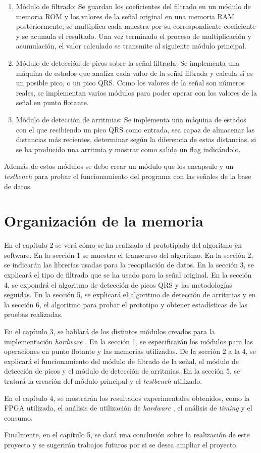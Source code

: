 	\begin{enumerate}
		\item Módulo de filtrado: Se guardan los coeficientes del filtrado en un módulo de memoria ROM y los valores de la señal original en una memoria RAM posteriormente, se multiplica cada muestra por su correspondiente coeficiente y se acumula el resultado. Una vez terminado el proceso de multiplicación y acumulación, el valor calculado se transmite al siguiente módulo principal.
		\item Módulo de detección de picos sobre la señal filtrada: Se implementa una máquina de estados que analiza cada valor de la señal filtrada y calcula si es un posible pico, o un pico QRS. Como los valores de la señal son números reales, se implementan varios módulos para poder operar con los valores de la señal en punto flotante. 
		\item Módulo de detección de arritmias: Se implementa una máquina de estados con el que recibiendo un pico QRS como entrada, sea capaz de almacenar las distancias más recientes, determinar según la diferencia de estas distancias, si se ha producido una arritmia y mostrar como salida un flag indicándolo.
	\end{enumerate}
	
	Además de estos módulos se debe crear un módulo que los encapsule y un \textit{testbench} para probar el funcionamiento del programa con las señales de la base de datos\cite{desai2021low}.

\section{Organización de la memoria}
En el capítulo 2 se verá cómo se ha realizado el prototipado del algoritmo en software. En la sección 1 se muestra el transcurso del algoritmo. En la sección 2, se indicarán las librerías usadas para la recopilación de datos. En la sección 3, se explicará el tipo de filtrado que se ha usado para la señal original. En la sección 4, se expondrá el algoritmo de detección de picos QRS y las metodologías seguidas. En la sección 5, se explicará el algoritmo de detección de arritmias y en la sección 6, el algoritmo para probar el prototipo y obtener estadísticas de las pruebas realizadas.

En el capítulo 3, se hablará de los distintos módulos creados para la implementación  \textit{hardware} . En la sección 1, se especificarán los módulos para las operaciones en punto flotante y las memorias utilizadas. De la sección 2 a la 4, se explicará el funcionamiento del módulo de filtrado de la señal, el módulo de detección de picos y el módulo de detección de arritmias. En la sección 5, se tratará la creación del módulo principal y el \textit{testbench} utilizado.

En el capítulo 4, se mostrarán los resultados experimentales obtenidos, como la FPGA utilizada, el análisis de utilización de  \textit{hardware} , el análisis de  \textit{timing}  y el consumo.

Finalmente, en el capítulo 5, se dará una conclusión sobre la realización de este proyecto y se sugerirán trabajos futuros por si se desea ampliar el proyecto.
